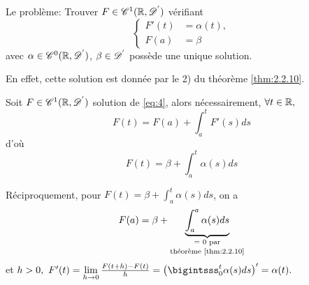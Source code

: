 \documentclass[french,a4paper,10pt]{article}
\begin{document}
            \begin{noremark}
                Le problème: Trouver $F \in \mathscr{C}^1(\mathbb{R},\mathscr{D^{'}})$ vérifiant 
                \begin{equation}
                    \begin{cases}\label{eq:4}
                        F'(t)&=\alpha(t),\\
                        F(a) &= \beta
                    \end{cases}
                \end{equation}
                avec $\alpha \in \mathscr{C}^0(\mathbb{R},\mathscr{D^{'}})$, $\beta \in \mathscr{D^{'}}$ possède une unique solution.

                En effet, cette solution est donnée par le 2) du théorème \ref{thm:2.2.10}. 

                Soit $F\in \mathscr{C}^1(\mathbb{R},\mathscr{D^{'}})$ solution de \eqref{eq:4}, alors nécessairement, $\forall t \in \mathbb{R},$
                \begin{equation*}
                    F(t)=F(a)+\int_a^tF'(s)ds
                \end{equation*}
                d'où
                \begin{equation*}
                    F(t) = \beta + \int_a^t \alpha (s)ds
                \end{equation*}

                Réciproquement, pour $F(t) = \beta + \int_a^t \alpha (s)ds$, on a 
                \begin{equation*}
                    F(a)=\beta+\underbrace{\int_a^a \alpha(s)ds}_{\text{\shortstack{= 0 par \\ 
                    théorème \ref{thm:2.2.10}}}}
                \end{equation*}
                et $h>0, \ F'(t) = \lim\limits_{h \to 0} \frac{F(t+h)-F(t)}{h}=\left( \bigintsss_0^t  \alpha(s)ds \right)'=\alpha(t).$ 
            \end{noremark}
\end{document}

